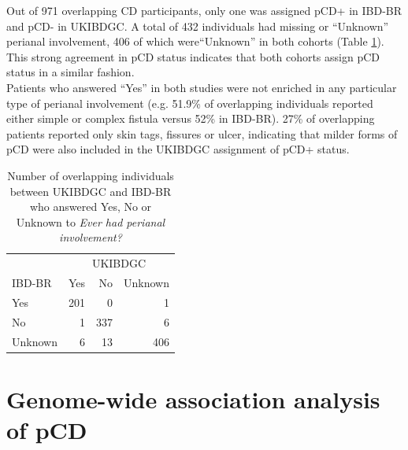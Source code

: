 Out of 971 overlapping CD participants, only one was assigned pCD+ in IBD-BR and pCD- in UKIBDGC. A total of 432 individuals had missing or “Unknown” perianal involvement, 406 of which were“Unknown” in both cohorts (Table \ref{table:cohort_pcd_agree}). This strong agreement in pCD status indicates that both cohorts assign pCD status in a similar fashion.\\

Patients who answered “Yes'' in both studies were not enriched in any particular type of perianal involvement (e.g. 51.9\% of overlapping individuals reported either simple or complex fistula versus 52\% in IBD-BR). 27\% of overlapping patients reported only skin tags, fissures or ulcer, indicating that milder forms of pCD were also included in the UKIBDGC assignment of pCD+ status.


\begin{table}[htb]
  \caption{Number of overlapping individuals between UKIBDGC and IBD-BR who answered Yes, No or Unknown to \textit{Ever had perianal involvement?}}
  \label{table:cohort_pcd_agree}
  \centering
  \begin{tabular}[t]{|l|r|r|r|}
  \hline
  \multicolumn{1}{|c|}{ } & \multicolumn{3}{c|}{UKIBDGC} \\
  \cline{2-4}
  IBD-BR& Yes & No & Unknown\\
  \hline
  Yes & 201 & 0 & 1\\
  \hline
  No & 1 & 337 & 6\\
  \hline
  Unknown & 6 & 13 & 406\\
  \hline
  \end{tabular}
  \end{table}

  \section{Genome-wide association analysis of pCD}
